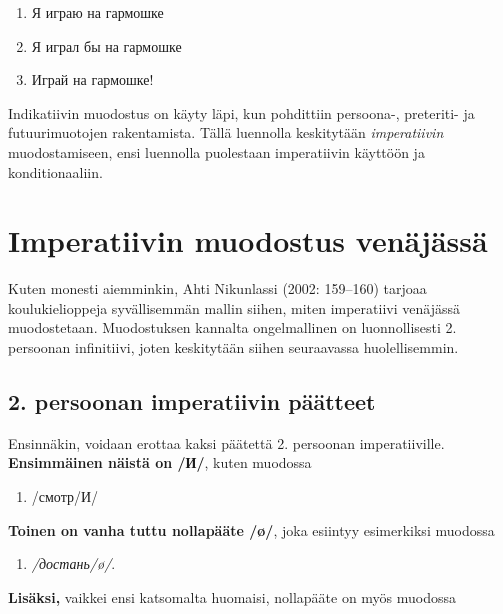 \documentclass[]{scrreprt}
\providecommand{\tightlist}{%
  \setlength{\itemsep}{0pt}\setlength{\parskip}{0pt}}
\begin{document}
\begin{enumerate}
\def\labelenumi{(\arabic{enumi})}
\setcounter{enumi}{349}
\tightlist
\item
  Я играю на гармошке
\item
  Я играл бы на гармошке
\item
  Играй на гармошке!
\end{enumerate}

Indikatiivin muodostus on käyty läpi, kun pohdittiin persoona-,
preteriti- ja futuurimuotojen rakentamista. Tällä luennolla keskitytään
\emph{imperatiivin} muodostamiseen, ensi luennolla puolestaan
imperatiivin käyttöön ja konditionaaliin.

\section{Imperatiivin muodostus
venäjässä}\label{imperatiivin-muodostus-venuxe4juxe4ssuxe4}

Kuten monesti aiemminkin, Ahti Nikunlassi (2002: 159--160) tarjoaa
koulukielioppeja syvällisemmän mallin siihen, miten imperatiivi
venäjässä muodostetaan. Muodostuksen kannalta ongelmallinen on
luonnollisesti 2. persoonan infinitiivi, joten keskitytään siihen
seuraavassa huolellisemmin.

\subsection{2. persoonan imperatiivin
päätteet}\label{persoonan-imperatiivin-puxe4uxe4tteet}

Ensinnäkin, voidaan erottaa kaksi päätettä 2. persoonan imperatiiville.
\textbf{Ensimmäinen näistä on /И/}, kuten muodossa

\begin{enumerate}
\def\labelenumi{(\arabic{enumi})}
\setcounter{enumi}{352}
\tightlist
\item
  /смотр/И/
\end{enumerate}

\textbf{Toinen on vanha tuttu nollapääte /ø/}, joka esiintyy esimerkiksi
muodossa

\begin{enumerate}
\def\labelenumi{(\arabic{enumi})}
\setcounter{enumi}{353}
\tightlist
\item
  \emph{/достань/ø/}.
\end{enumerate}

\textbf{Lisäksi,} vaikkei ensi katsomalta huomaisi, nollapääte on myös
muodossa
\end{document}
